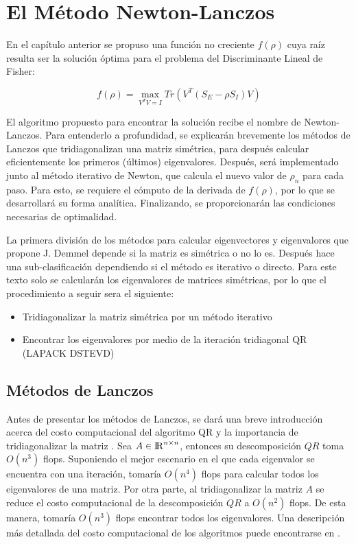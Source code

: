 \chapter{El Método Newton-Lanczos}
\label{ch:chapter3}
 
En el capítulo anterior se propuso una función no creciente $f(\rho)$ cuya raíz resulta ser la solución óptima para el problema del Discriminante Lineal de Fisher:

\begin{equation} \label{eq:3.1}
	f(\rho) = \max_{V^T V = I} Tr(V^T(S_E - \rho S_I)V)
\end{equation}

El algoritmo propuesto para encontrar la solución recibe el nombre de Newton-Lanczos\cite{ngo2012trace}. Para entenderlo a profundidad, se explicarán brevemente los métodos de Lanczos que tridiagonalizan una matriz simétrica, para después calcular eficientemente los primeros (últimos) eigenvalores. Después, será implementado junto al método iterativo de Newton, que calcula el nuevo valor de $\rho_{n}$ para cada paso. Para esto, se requiere el cómputo de la derivada de $f(\rho)$, por lo que se desarrollará su forma analítica. Finalizando, se proporcionarán las condiciones necesarias de optimalidad.

La primera división de los métodos para calcular eigenvectores y eigenvalores que propone J. Demmel \cite{demmel1997applied} depende si la matriz es simétrica o no lo es. Después hace una sub-clasificación dependiendo si el método es iterativo o directo. Para este texto solo se calcularán los eigenvalores de matrices simétricas, por lo que el procedimiento a seguir sera el siguiente:


\begin{itemize}
\item Tridiagonalizar la matriz simétrica por un método iterativo
\item Encontrar los eigenvalores por medio de la iteración tridiagonal QR (LAPACK DSTEVD)
\end{itemize}
\section{Métodos de Lanczos}
Antes de presentar los métodos de Lanczos, se dará una breve introducción acerca del costo computacional del algoritmo QR y la importancia de tridiagonalizar la matriz \cite{demmel1997applied}.  Sea $A \in {\rm I\!R}^{n \times n}$, entonces su descomposición $QR$ toma $O(n^3)$ flops. Suponiendo el mejor escenario en el que cada eigenvalor se encuentra con una iteración, tomaría $O(n^4)$ flops para calcular todos los eigenvalores de una matriz. Por otra parte, al tridiagonalizar la matriz $A$ se reduce el costo computacional de la descomposición $QR$ a $O(n^2)$ flops. De esta manera, tomaría $O(n^3)$ flops encontrar todos los eigenvalores. Una descripción más detallada del costo computacional de los algoritmos puede encontrarse en \cite{demmel1997applied}.

